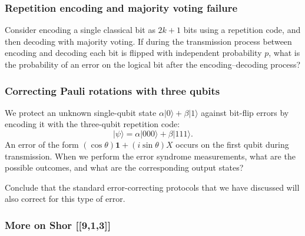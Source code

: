 \documentclass[fleqn,a4paper]{article}
\theoremstyle{definition}
\theoremstyle{definition}
\theoremstyle{definition}
\theoremstyle{definition}
\theoremstyle{remark}
\begin{document}
\hypertarget{repetition-encoding-and-majority-voting-failure}{%
\subsubsection{Repetition encoding and majority voting failure}\label{repetition-encoding-and-majority-voting-failure}}

Consider encoding a single classical bit as \(2k+1\) bits using a repetition code, and then decoding with majority voting.
If during the transmission process between encoding and decoding each bit is flipped with independent probability \(p\), what is the probability of an error on the logical bit after the encoding--decoding process?

\hypertarget{three-qubits-correcting-rotations}{%
\subsubsection{Correcting Pauli rotations with three qubits}\label{three-qubits-correcting-rotations}}

We protect an unknown single-qubit state \(\alpha|0\rangle+\beta|1\rangle\) against bit-flip errors by encoding it with the three-qubit repetition code:
\[
  |\psi\rangle
  = \alpha|000\rangle + \beta|111\rangle.
\]
An error of the form \((\cos\theta)\mathbf{1}+(i\sin\theta)X\) occurs on the first qubit during transmission.
When we perform the error syndrome measurements, what are the possible outcomes, and what are the corresponding output states?

Conclude that the standard error-correcting protocols that we have discussed will also correct for this type of error.

\hypertarget{more-on-shor-913}{%
\subsubsection{More on Shor {[}{[}9,1,3{]}{]}}\label{more-on-shor-913}}
\end{document}
